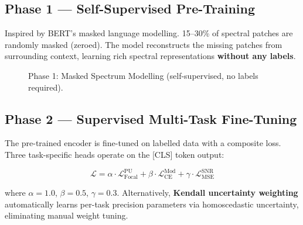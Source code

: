 \documentclass[12pt,a4paper]{article}
\begin{document}
\subsection{Phase 1 --- Self-Supervised Pre-Training}

Inspired by BERT's masked language modelling. 15--30\% of spectral patches are randomly masked (zeroed). The model reconstructs the missing patches from surrounding context, learning rich spectral representations \textbf{without any labels}.

\begin{figure}[H]\centering
{}
\caption{Phase 1: Masked Spectrum Modelling (self-supervised, no labels required).}
\end{figure}

\subsection{Phase 2 --- Supervised Multi-Task Fine-Tuning}

The pre-trained encoder is fine-tuned on labelled data with a composite loss. Three task-specific heads operate on the [CLS] token output:

\begin{equation}
\mathcal{L} = \alpha\cdot\mathcal{L}_{\text{Focal}}^{\text{PU}} + \beta\cdot\mathcal{L}_{\text{CE}}^{\text{Mod}} + \gamma\cdot\mathcal{L}_{\text{MSE}}^{\text{SNR}}
\end{equation}

\noindent where $\alpha{=}1.0$, $\beta{=}0.5$, $\gamma{=}0.3$. Alternatively, \textbf{Kendall uncertainty weighting} automatically learns per-task precision parameters via homoscedastic uncertainty, eliminating manual weight tuning.
\end{document}
